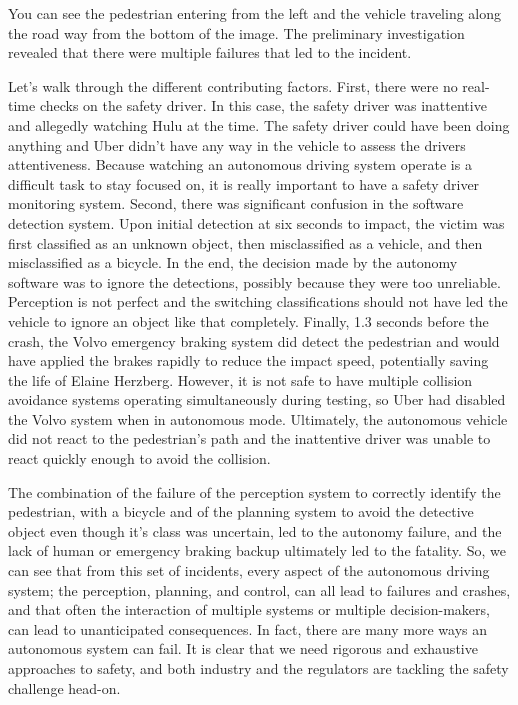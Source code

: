 You can see the pedestrian entering from the left and the vehicle traveling along the road way from the bottom of the image. 
The preliminary investigation revealed that there were multiple failures that led to the incident. 

Let's walk through the different contributing factors. First, there were no real-time checks on the safety driver. 
In this case, the safety driver was inattentive and allegedly watching Hulu at the time. 
The safety driver could have been doing anything and Uber didn't have any way in the vehicle 
to assess the drivers attentiveness. Because watching an autonomous driving system operate is a difficult 
task to stay focused on, it is really important to have a safety driver monitoring system. 
Second, there was significant confusion in the software detection system. 
Upon initial detection at six seconds to impact, the victim was first classified 
as an unknown object, then misclassified as a vehicle, and then misclassified as a bicycle. 
In the end, the decision made by the autonomy software was to ignore the detections, possibly because they were too unreliable. 
Perception is not perfect and the switching classifications should not have 
led the vehicle to ignore an object like that completely. 
Finally, 1.3 seconds before the crash, the Volvo emergency braking system did detect the 
pedestrian and would have applied the brakes rapidly to reduce the impact speed, potentially saving the life of Elaine Herzberg. 
However, it is not safe to have multiple collision avoidance systems operating simultaneously during testing, so Uber had disabled the Volvo system when in autonomous mode. 
Ultimately, the autonomous vehicle did not react to the pedestrian's path and the inattentive driver was unable to react quickly enough to avoid the collision. 

The combination of the failure of the perception system to correctly identify the pedestrian, with a bicycle and of the planning system to avoid the detective 
object even though it's class was uncertain, led to the autonomy failure, and the lack of human or emergency braking backup ultimately led to the fatality. 
So, we can see that from this set of incidents, every aspect of the autonomous driving system; the perception, planning, and control, 
can all lead to failures and crashes, and that often the interaction of multiple systems or multiple decision-makers, can lead to unanticipated consequences. 
In fact, there are many more ways an autonomous system can fail. 
It is clear that we need rigorous and exhaustive approaches to safety, and both industry and the regulators are tackling the safety challenge head-on. 

